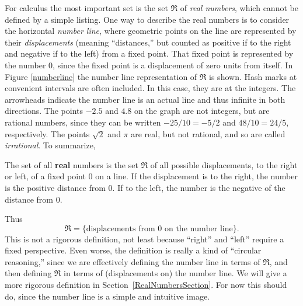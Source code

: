 For calculus the most
important set is the set $\Re$ of {\it real numbers}, which cannot be defined
by a simple listing.  One way to describe the real numbers
is to consider the horizontal {\it number line}, where geometric points on 
the line are represented by their {\it displacements} 
(meaning ``distances,'' but counted as positive if to the right
and negative if to the left) from a fixed point.
That fixed point is represented by the number 0, since the fixed
point is a displacement of zero units from itself.
In Figure \ref{numberline} the  number line representation of $\Re$
is shown.  Hash marks at convenient intervals are often included.
In this case, they are at the integers.  The arrowheads indicate
the number line is an actual line and thus infinite in both directions.  
The points $-2.5$ and $4.8$ on the graph are not integers, but are
rational numbers, since they can be written
$-25/10=-5/2$ and $48/10=24/5$, respectively.
The points $\sqrt2$ and $\pi$ are real, but not rational, and
so are called {\it irrational}.  To summarize,
\begin{definition}The set of all {\bf real} numbers is 
the set $\Re$ of all possible displacements, to the right
or left, of a fixed point $0$ on a line.  
If the displacement is to the right, the number is the positive
distance from $0$.  If to the left, the number is the negative
of the distance from $0$.\end{definition}
Thus 
\begin{equation}\Re=\{\text{displacements from $0$ on the number line}\}.
\end{equation}
This is not a rigorous definition, not least because ``right'' and
``left'' require a fixed perspective.  Even worse,
the definition is really a kind of
``circular reasoning,'' since
we are effectively defining the number line in terms of $\Re$, and
then defining $\Re$ in terms of (displacements on) 
the number line.  We will give a 
more rigorous definition in Section~\ref{RealNumbersSection}.  
For now this should do,
since the number line is a simple and intuitive image. 

